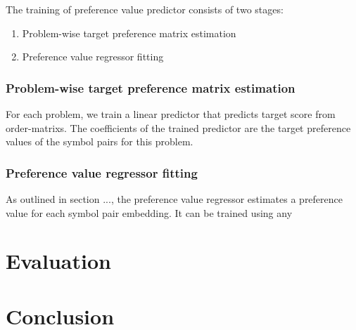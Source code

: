 The training of preference value predictor consists of two stages:

\begin{enumerate}
	\item Problem-wise target preference matrix estimation
	\item Preference value regressor fitting
\end{enumerate}

\subsubsection{Problem-wise target preference matrix estimation}

For each problem,
we train a linear predictor
that predicts target score from \glspl{order-matrix}.
The coefficients of the trained predictor are the target preference values of the symbol pairs for this problem.

\subsubsection{Preference value regressor fitting}

As outlined in section ...,
the preference value regressor estimates a preference value for each symbol pair embedding.
It can be trained using any 

\section{Evaluation}
\label{sec:evaluation}

\section{Conclusion}

\glsaddall
\printglossaries





